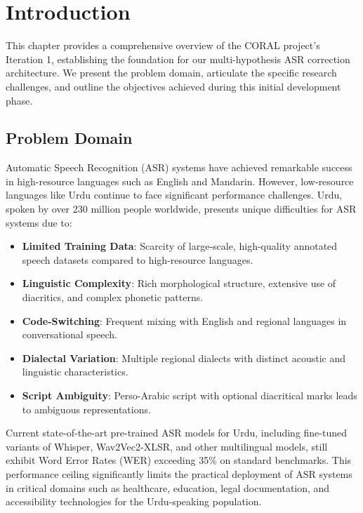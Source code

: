 \chapter{Introduction}
\label{sec:introduction}

This chapter provides a comprehensive overview of the CORAL project's Iteration 1, establishing the foundation for our multi-hypothesis ASR correction architecture. We present the problem domain, articulate the specific research challenges, and outline the objectives achieved during this initial development phase.

\section{Problem Domain}

Automatic Speech Recognition (ASR) systems have achieved remarkable success in high-resource languages such as English and Mandarin. However, low-resource languages like Urdu continue to face significant performance challenges. Urdu, spoken by over 230 million people worldwide, presents unique difficulties for ASR systems due to:

\begin{itemize}
    \item \textbf{Limited Training Data}: Scarcity of large-scale, high-quality annotated speech datasets compared to high-resource languages.
    \item \textbf{Linguistic Complexity}: Rich morphological structure, extensive use of diacritics, and complex phonetic patterns.
    \item \textbf{Code-Switching}: Frequent mixing with English and regional languages in conversational speech.
    \item \textbf{Dialectal Variation}: Multiple regional dialects with distinct acoustic and linguistic characteristics.
    \item \textbf{Script Ambiguity}: Perso-Arabic script with optional diacritical marks leads to ambiguous representations.
\end{itemize}

Current state-of-the-art pre-trained ASR models for Urdu, including fine-tuned variants of Whisper, Wav2Vec2-XLSR, and other multilingual models, still exhibit Word Error Rates (WER) exceeding 35\% on standard benchmarks. This performance ceiling significantly limits the practical deployment of ASR systems in critical domains such as healthcare, education, legal documentation, and accessibility technologies for the Urdu-speaking population.

